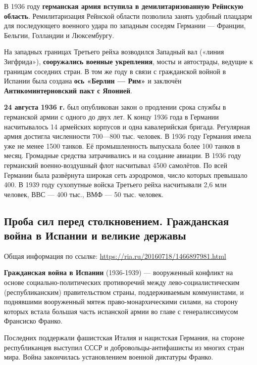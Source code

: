 \documentclass{article}
\begin{document}
\hfill

В 1936 году \textbf{германская армия вступила в демилитаризованную Рейнскую область}. Ремилитаризация Рейнской области позволила занять удобный плацдарм для последующего военного удара по западным соседям Германии — Франции, Бельгии, Голландии и Люксембургу.

На западных границах Третьего рейха возводился Западный вал («линия Зигфрида»), \textbf{сооружались военные укрепления}, мосты и автострады, ведущие к границам соседних стран. В том же году в связи с гражданской войной в Испании была создана \textbf{ось «Берлин — Рим»} и заключён \textbf{Антикоминтерновский пакт с Японией}.

\textbf{24 августа 1936 г.} был опубликован закон о продлении срока службы в германской армии с одного до двух лет. К концу 1936 года в Германии насчитывалось 14 армейских корпусов и одна кавалерийская бригада. Регулярная армия достигла численности 700—800 тыс. человек. В 1936 году Германия имела уже не менее 1500 танков. Её промышленность выпускала более 100 танков в месяц. Громадные средства затрачивались и на создание авиации. В 1936 году германский военно-воздушный флот насчитывал 4500 самолётов. По всей Германии была развёрнута широкая сеть аэродромов, число которых превышало 400. В 1939 году сухопутные войска Третьего рейха насчитывали 2,6 млн человек, ВВС — 400 тыс., ВМФ — 50 тыс. человек.

\pagebreak
\subsection{Проба сил перед столкновением. Гражданская война в Испании и великие державы}

Общая информация по ссылке: \url{https://ria.ru/20160718/1466897981.html}

\hfill

\textbf{Гражданская война в Испании} (1936-1939) — вооруженный конфликт на основе социально-политических противоречий между лево-социалистическим (республиканским) правительством страны, поддерживаемым коммунистами, и поднявшими вооруженный мятеж право-монархическими силами, на сторону которых встала большая часть испанской армии во главе с генералиссимусом Франсиско Франко.

\hfill

Последних поддержали фашистская Италия и нацистская Германия, на стороне республиканцев выступил СССР и добровольцы-антифашисты из многих стран мира. Война закончилась установлением военной диктатуры Франко.
\end{document}
